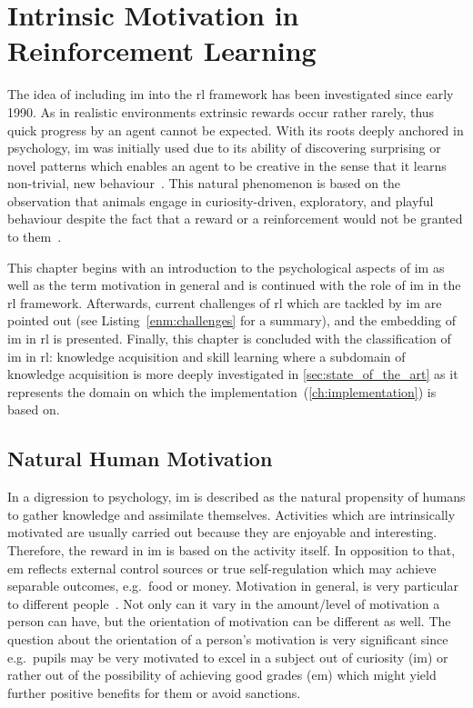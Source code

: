 \documentclass[draft,final]{vutinfth} %
\newcommand{\pautoref}[1]{(\autoref{#1})}
\begin{document}
    \chapter{Intrinsic Motivation in Reinforcement Learning}\label{ch:intrinsic-motivation-in-reinforcement-learning}
    The idea of including \gls{im} into the \gls{rl} framework has been investigated since early 1990.
    As in realistic environments extrinsic rewards occur rather rarely, thus quick progress by an agent cannot be expected.
    With its roots deeply anchored in psychology, \gls{im} was initially used due to its ability of discovering surprising or novel patterns which enables an agent to be creative in the sense that it learns non-trivial, new behaviour~\citep{schmidhuber_formal_2010}.
    This natural phenomenon is based on the observation that animals engage in curiosity-driven, exploratory, and playful behaviour despite the fact that a reward or a reinforcement would not be granted to them~\citep{white_motivation_1959}.

    This chapter begins with an introduction to the psychological aspects of \gls{im} as well as the term motivation in general and is continued with the role of \gls{im} in the \gls{rl} framework.
    Afterwards, current challenges of \gls{rl} which are tackled by \gls{im} are pointed out (see Listing~\ref{enm:challenges} for a summary), and the embedding of \gls{im} in \gls{rl} is presented.
    Finally, this chapter is concluded with the classification of \gls{im} in \gls{rl}: knowledge acquisition and skill learning where a subdomain of knowledge acquisition is more deeply investigated in \autoref{sec:state_of_the_art} as it represents the domain on which the implementation~\pautoref{ch:implementation} is based on.


    \section{Natural Human Motivation}

    In a digression to psychology, \gls{im} is described as the natural propensity of humans to gather knowledge and assimilate themselves.
    Activities which are intrinsically motivated are usually carried out because they are enjoyable and interesting.
    Therefore, the reward in \gls{im} is based on the activity itself.
    In opposition to that, \gls{em} reflects external control sources or true self-regulation which may achieve separable outcomes, e.g.\ food or money.
    Motivation in general, is very particular to different people~\citep{ryan_intrinsic_2000}.
    Not only can it vary in the amount/level of motivation a person can have, but the orientation of motivation can be different as well.
    The question about the orientation of a person's motivation is very significant since e.g.\ pupils may be very motivated to excel in a subject out of curiosity (\gls{im}) or rather out of the possibility of achieving good grades (\gls{em}) which might yield further positive benefits for them or avoid sanctions.
\end{document}
